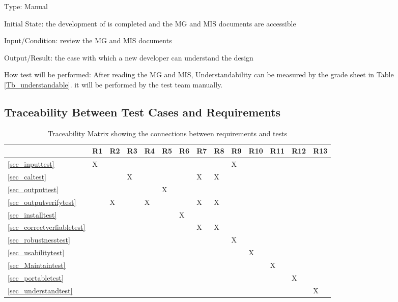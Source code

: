 \documentclass[12pt, titlepage]{article}
\begin{document}
\begin{enumerate}
Type: Manual
					
Initial State: the development of \progname{} is completed and the MG and MIS
documents are accessible
					
Input/Condition: review the MG and MIS documents
					
Output/Result: the ease
with which a new developer can understand the design
					
How test will be performed: After reading the MG and MIS, Understandability can
be measured by the grade sheet in Table \ref{Tb_understandable}. it will be
performed by the test team manually.

\end{enumerate}


\subsection{Traceability Between Test Cases and Requirements}


\begin{table}[h]
\begin{tabular}{|l|l|l|l|l|l|l|l|l|l|l|l|l|l|}
\hline
 & R1 & R2 & R3 & R4 & R5 & R6 & R7 & R8 & R9 & R10 & R11 & R12 & R13 \\ \hline
\ref{sec_inputtest} & X &  &  &  &  &  &  &  & X &  &  &  &  \\ \hline
\ref{sec_caltest} &  &  & X &  &  &  & X & X &  &  &  &  &  \\ \hline
\ref{sec_outputtest} &  &  &  &  & X &  &  &  &  &  &  &  &  \\ \hline
\ref{sec_outputverifytest} &  & X &  & X &  &  & X & X &  &  &  &  &  \\ \hline
\ref{sec_installtest} &  &  &  &  &  & X &  &  &  &  &  &  &  \\ \hline
\ref{sec_correctverfiabletest} &  &  &  &  &  &  & X & X &  &  &  &  &  \\ \hline
\ref{sec_robustnesstest} &  &  &  &  &  &  &  &  & X &  &  &  &  \\ \hline
\ref{sec_usabilitytest} &  &  &  &  &  &  &  &  &  & X &  &  &  \\ \hline
\ref{sec_Maintaintest} &  &  &  &  &  &  &  &  &  &  & X &  &  \\ \hline
\ref{sec_portabletest} &  &  &  &  &  &  &  &  &  &  &  & X &  \\ \hline
\ref{sec_understandtest} &  &  &  &  &  &  &  &  &  &  &  &  & X \\ \hline
\end{tabular}
\caption{Traceability Matrix showing the connections between requirements and tests}
\label{Tb_trace}
\end{table}
\end{document}
